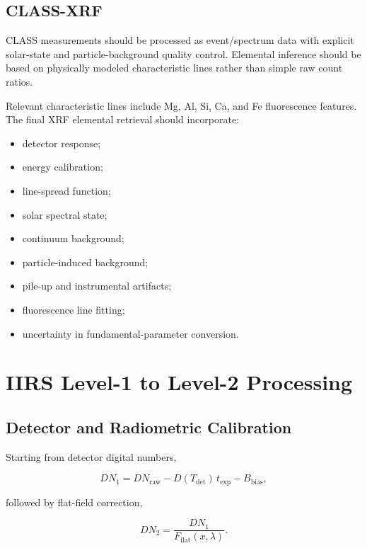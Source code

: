 \documentclass[11pt,a4paper]{article}
\begin{document}
\subsection{CLASS-XRF}

CLASS measurements should be processed as event/spectrum data with explicit solar-state and particle-background quality control. Elemental inference should be based on physically modeled characteristic lines rather than simple raw count ratios.

Relevant characteristic lines include Mg, Al, Si, Ca, and Fe fluorescence features. The final XRF elemental retrieval should incorporate:

\begin{itemize}
    \item detector response;
    \item energy calibration;
    \item line-spread function;
    \item solar spectral state;
    \item continuum background;
    \item particle-induced background;
    \item pile-up and instrumental artifacts;
    \item fluorescence line fitting;
    \item uncertainty in fundamental-parameter conversion.
\end{itemize}

\section{IIRS Level-1 to Level-2 Processing}

\subsection{Detector and Radiometric Calibration}

Starting from detector digital numbers,

\begin{equation}
DN_1
=
DN_{\mathrm{raw}}
-
D(T_{\mathrm{det}})\,t_{\mathrm{exp}}
-
B_{\mathrm{bias}},
\end{equation}

followed by flat-field correction,

\begin{equation}
DN_2 =
\frac{DN_1}{F_{\mathrm{flat}}(x,\lambda)}.
\end{equation}
\end{document}
